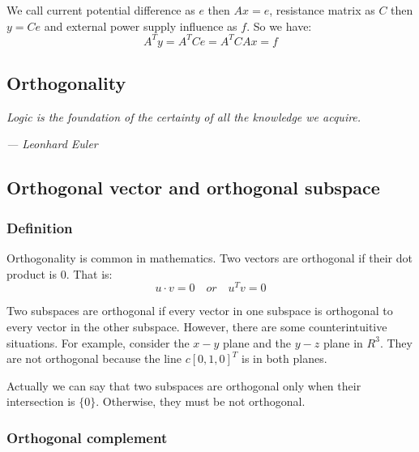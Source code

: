 \documentclass[12pt]{ctexart}
\begin{document}
We call current potential difference as $e$ then $Ax = e$, resistance matrix as $C$ then
$y = Ce$ and external power supply influence as $f$. So we have:
\[
  A^{T}y = A^{T}Ce = A^{T}CAx = f
\]

\newpage
\thispagestyle{empty}
\begin{center}
    \vspace*{96pt}
    \fontsize{60}{60}\par
    \fontsize{26}{31.2}\section{\textbf{Orthogonality}}\par %
    \vspace{25pt}
    \begin{center}
      \fontsize{18}{21.6}\customfont\textit{Logic is the foundation of the certainty of all
      the knowledge we acquire.}
    \end{center}
    \begin{flushright}
      \fontsize{18}{21.6}\customfont\textit{--- Leonhard Euler}
    \end{flushright}
    \vfill
\end{center}

\newpage
\subsection{\textbf{Orthogonal vector and orthogonal subspace}}
\subsubsection{\textbf{Definition}}

Orthogonality is common in mathematics. Two vectors are orthogonal if their dot product
is 0. That is:
\[
  u \cdot v = 0 \quad or \quad u^{T}v = 0
\]

Two subspaces are orthogonal if every vector in one subspace is orthogonal to every
vector in the other subspace. However, there are some counterintuitive situations.
For example, consider the $x-y$ plane and the $y-z$ plane in $R^{3}$. They are not
orthogonal because the line $c[0, 1, 0]^T$ is in both planes.


Actually we can say that two subspaces are orthogonal only when their intersection is
$\{0\}$. Otherwise, they must be not orthogonal. 

\subsubsection{\textbf{Orthogonal complement}}
\end{document}
